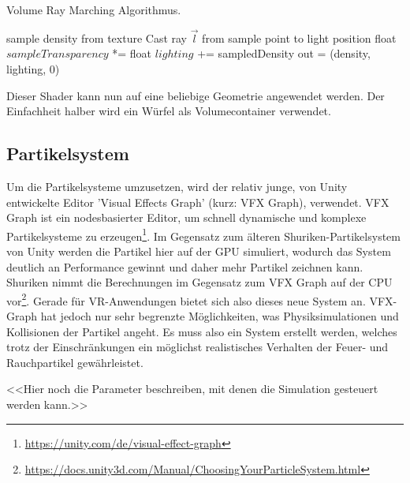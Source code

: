 \begin{algorithm}
	\caption{Volume Ray Marching Algorithmus.}\label{alg:rayM}
	\begin{algorithmic}[1]
		\State sample density from texture
		\State Cast ray $\vec{l}$ from sample point to light position
		\State float $sampleTransparency$ *=
		\State float $lighting$ += sampledDensity
		\EndFor
		\EndFor
		\State out = (density, lighting, 0)
	\end{algorithmic}
\end{algorithm}

Dieser Shader kann nun auf eine beliebige Geometrie angewendet werden. Der Einfachheit halber wird ein Würfel als Volumecontainer verwendet.

\subsection{Partikelsystem}
Um die Partikelsysteme umzusetzen, wird der relativ junge, von Unity entwickelte Editor 'Visual Effects Graph'
(kurz: VFX Graph), verwendet. VFX Graph ist ein nodesbasierter Editor, um schnell
dynamische und komplexe Partikelsysteme zu erzeugen\footnote{\url{https://unity.com/de/visual-effect-graph}}.
Im Gegensatz zum älteren Shuriken-Partikelsystem von Unity werden die Partikel hier auf der GPU
simuliert, wodurch das System deutlich an Performance gewinnt und daher mehr Partikel zeichnen kann.
Shuriken nimmt die Berechnungen im Gegensatz zum VFX Graph auf der CPU vor\footnote{\url{https://docs.unity3d.com/Manual/ChoosingYourParticleSystem.html}}.
Gerade für VR-Anwendungen bietet sich also dieses neue System an.
VFX-Graph hat jedoch nur sehr begrenzte Möglichkeiten, was Physiksimulationen und Kollisionen der Partikel angeht.
Es muss also ein System erstellt werden, welches trotz der Einschränkungen ein möglichst realistisches
Verhalten der Feuer- und Rauchpartikel gewährleistet.

<<Hier noch die Parameter beschreiben, mit denen die Simulation gesteuert werden kann.>>